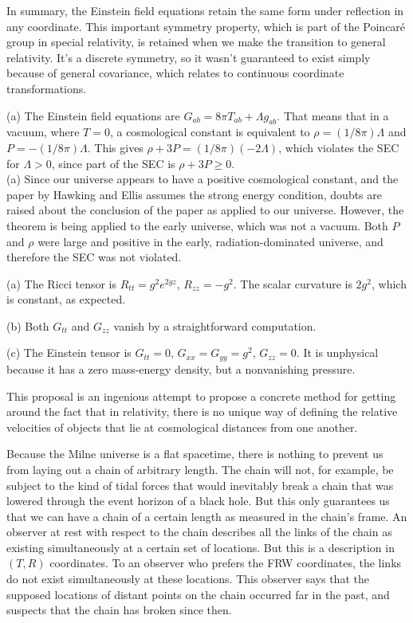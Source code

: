 In summary, the Einstein field equations retain the same form under reflection in any coordinate. This
important symmetry property, which is part of the  Poincar\'{e} group in special relativity,
is retained when we make the transition to general relativity. It's a discrete symmetry, so it wasn't guaranteed
to exist simply because of general covariance, which relates to continuous coordinate transformations.

(a) The Einstein field equations are $G_{ab}=8\pi T_{ab}+\Lambda g_{ab}$.
That means that in a vacuum, where $T=0$, a cosmological constant is equivalent to $\rho=(1/8\pi)\Lambda$ and $P=-(1/8\pi)\Lambda$. 
This gives $\rho+3P=(1/8\pi)(-2\Lambda)$, which violates the SEC for $\Lambda>0$, since part of the SEC is $\rho+3P \ge 0$.\\
(a) Since our universe appears to have a positive cosmological constant, and the paper by Hawking and Ellis
assumes the strong energy condition, doubts are raised about the conclusion of the paper as applied to our universe.
However, the theorem is being applied to the early universe, which was not a vacuum. Both $P$ and $\rho$ were
large and positive in the early, radiation-dominated universe, and therefore the SEC was not violated.


(a) The Ricci tensor is $R_{tt}=g^2e^{2gz}$, $R_{zz}=-g^2$. The scalar curvature is $2g^2$, which is constant, as expected.

(b) Both $G_{tt}$ and $G_{zz}$ vanish by a straightforward computation.

(c) The Einstein tensor is $G_{tt}=0$, $G_{xx}=G_{yy}=g^2$, $G_{zz}=0$. It is unphysical because it has a zero mass-energy density,
but a nonvanishing pressure.


This proposal is an ingenious attempt to propose a concrete method for getting around the fact that in relativity,
there is no unique way of defining the relative velocities of objects that lie at cosmological distances from one
another.

Because the Milne universe is a flat spacetime, there is nothing to prevent us from laying out a chain
of arbitrary length. The chain will not, for example, be subject to the kind of tidal forces that
would inevitably break a chain that was lowered through the event horizon of a black hole. But this
only guarantees us that we can have a chain of a certain length as measured in the chain's frame.
An observer at rest with respect to the chain describes all the links of the chain as existing
simultaneously at a certain set of locations. But this is a description in $(T,R)$ coordinates.
To an observer who prefers the FRW coordinates, the links do not exist simultaneously at these
locations. This observer says that the supposed locations of distant points on the chain occurred far in
the past, and suspects that the chain has broken since then.

